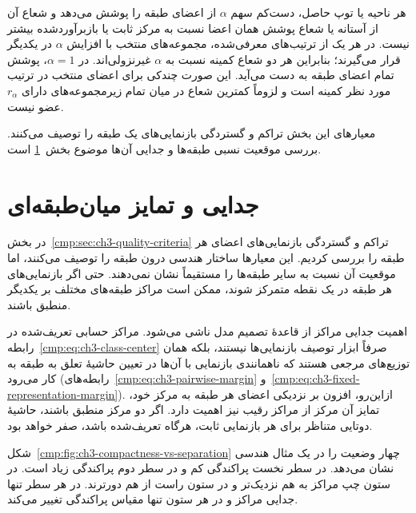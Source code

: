 هر ناحیه یا توپ حاصل، دست‌کم سهم $\alpha$ از اعضای
طبقه را پوشش می‌دهد و شعاع آن از آستانه یا شعاع
پوشش همان اعضا نسبت به مرکز ثابت یا بازبرآوردشده
بیشتر نیست. در هر یک از ترتیب‌های معرفی‌شده، مجموعه‌های
منتخب با افزایش $\alpha$ در یکدیگر قرار می‌گیرند؛
بنابراین هر دو شعاع کمینه نسبت به $\alpha$ غیرنزولی‌اند.
در $\alpha=1$، پوشش تمام اعضای طبقه به دست می‌آید.
این صورت چندکی برای اعضای منتخب در ترتیب مورد نظر
کمینه است و لزوماً کمترین شعاع در میان تمام
زیرمجموعه‌های دارای $r_\alpha$ عضو نیست.

معیارهای این بخش تراکم و گستردگی بازنمایی‌های یک
طبقه را توصیف می‌کنند. بررسی موقعیت نسبی طبقه‌ها
و جدایی آن‌ها موضوع بخش~\ref{cmp:sec:ch3-interclass-geometry}
است.

\section{جدایی و تمایز میان‌طبقه‌ای}
\label{cmp:sec:ch3-interclass-geometry}

در بخش~\ref{cmp:sec:ch3-quality-criteria} تراکم و گستردگی
بازنمایی‌های اعضای هر طبقه را بررسی کردیم. این معیارها
ساختار هندسی درون طبقه را توصیف می‌کنند، اما موقعیت آن
نسبت به سایر طبقه‌ها را مستقیماً نشان نمی‌دهند. حتی اگر
بازنمایی‌های هر طبقه در یک نقطه متمرکز شوند، ممکن است
مراکز طبقه‌های مختلف بر یکدیگر منطبق باشند.

اهمیت جدایی مراکز از قاعدهٔ تصمیم مدل ناشی می‌شود.
مراکز حسابی تعریف‌شده در رابطه~\eqref{cmp:eq:ch3-class-center}
صرفاً ابزار توصیف بازنمایی‌ها نیستند، بلکه همان توزیع‌های
مرجعی هستند که ناهمانندی بازنمایی با آن‌ها در تعیین حاشیهٔ
تعلق به طبقه به کار می‌رود
(رابطه‌های~\eqref{cmp:eq:ch3-pairwise-margin}
و~\eqref{cmp:eq:ch3-fixed-representation-margin}).
ازاین‌رو، افزون بر نزدیکی اعضای هر طبقه به مرکز خود،
تمایز آن مرکز از مراکز رقیب نیز اهمیت دارد. اگر دو
مرکز منطبق باشند، حاشیهٔ دوتایی متناظر برای هر بازنمایی
ثابت، هرگاه تعریف‌شده باشد، صفر خواهد بود.

شکل~\ref{cmp:fig:ch3-compactness-vs-separation}
چهار وضعیت را در یک مثال هندسی نشان می‌دهد. در سطر
نخست پراکندگی کم و در سطر دوم پراکندگی زیاد است.
در ستون چپ مراکز به هم نزدیک‌تر و در ستون راست
از هم دورترند. در هر سطر تنها جدایی مراکز و در
هر ستون تنها مقیاس پراکندگی تغییر می‌کند.

